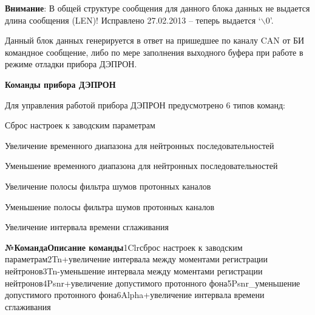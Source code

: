 \documentclass[a4paper,portrait,12pt]{article}
\begin{document}
{{{{\textbf{\textcolor[rgb]{1.000,0.000,0.000}{Внимание}}\textcolor[rgb]{1.000,0.000,0.000}{: В общей структуре сообщения для данного блока данных не выдается длина сообщения (}\textcolor[rgb]{1.000,0.000,0.000}{LEN}\textcolor[rgb]{1.000,0.000,0.000}{)! Исправлено 27.02.2013 -- теперь выдается {`}\ensuremath{\backslash}0'.}


Данный блок данных генерируется в ответ на пришедшее по каналу CAN от БИ командное сообщение, либо по мере заполнения выходного буфера при работе в режиме отладки прибора ДЭПРОН.


\begin{center}
\textbf{Команды прибора ДЭПРОН}
\end{center}


Для управления работой прибора ДЭПРОН предусмотрено 6 типов команд:


\begin{flushleft}
	Сброс настроек к заводским параметрам
\end{flushleft}


\begin{flushleft}
	Увеличение временного диапазона для нейтронных последовательностей
\end{flushleft}


\begin{flushleft}
	Уменьшение временного диапазона для нейтронных последовательностей
\end{flushleft}


\begin{flushleft}
	Увеличение полосы фильтра шумов протонных каналов
\end{flushleft}


\begin{flushleft}
	Уменьшение полосы фильтра шумов протонных каналов
\end{flushleft}


\begin{flushleft}
	Увеличение интервала времени сглаживания
\end{flushleft}





\textbf{{\small №КомандаОписание команды}}{\small 1Clr}{\small сброс настроек к заводским параметрам2Tn+увеличение интервала между моментами регистрации нейтронов3Tn-уменьшение интервала между моментами регистрации нейтронов4Psnr+увеличение допустимого протонного фона5Psnr\_уменьшение допустимого протонного фона6Alpha+увеличение интервала времени сглаживания}


}}}}
\end{document}

